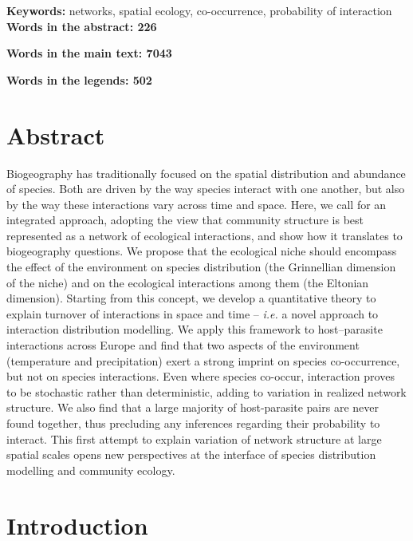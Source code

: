 \documentclass[12pt]{article}
\begin{document}
\textbf{Keywords:} networks, spatial ecology, co-occurrence, probability of interaction\\

\textbf{Words in the abstract: 226}

\textbf{Words in the main text: 7043}

\textbf{Words in the legends: 502}

\newpage
\doublespacing

\section*{Abstract}

Biogeography has traditionally focused on the spatial distribution and
abundance of species. Both are driven by the way species interact with one
another, but also by the way these interactions vary across time and space.
Here, we call for an integrated approach, adopting the view that community
structure is best represented as a network of ecological interactions, and
show how it translates to biogeography questions. We propose that the
ecological niche should encompass the effect of the environment
on species distribution (the Grinnellian dimension of the niche) and on the
ecological interactions among them (the Eltonian dimension). Starting from
this concept, we develop a quantitative theory to explain turnover of
interactions in space and time -- \emph{i.e.} a novel approach to interaction
distribution modelling. We apply this framework to host–parasite interactions
across Europe and find that two aspects of the environment (temperature and
precipitation) exert a strong imprint on species co-occurrence, but not on
species interactions. Even where species co-occur, interaction proves to be
stochastic rather than deterministic, adding to variation in realized network
structure. We also find that a large majority of host-parasite pairs are never
found together, thus precluding any inferences regarding their probability to
interact. This first attempt to explain variation of network structure at
large spatial scales opens new perspectives at the interface of species
distribution modelling and community ecology.

\newpage

\section*{Introduction}
\end{document}
